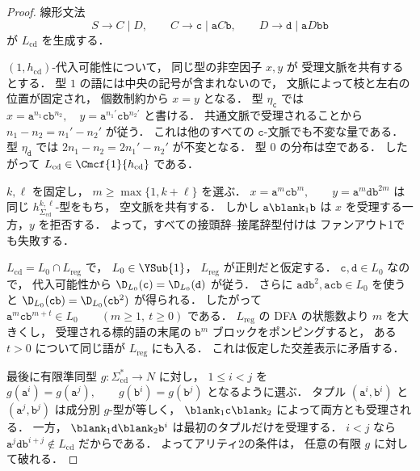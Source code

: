 \begin{proof}
線形文法
\[
 S\to C\mid D,\qquad
 C\to\mathtt c\mid\mathtt a C\mathtt b,\qquad
 D\to\mathtt d\mid\mathtt a D\mathtt b\mathtt b
\]
が $L_{\mathrm{cd}}$ を生成する．

$(1,h_{\mathrm{cd}})$-代入可能性について，
同じ型の非空因子 $x,y$ が
受理文脈を共有するとする．
型 $1$ の語には中央の記号が含まれないので，
文脈によって枝と左右の位置が固定され，
個数制約から $x=y$ となる．
型 $\eta_{\mathtt c}$ では
\(x=\mathtt a^{n_1}\mathtt c\mathtt b^{n_2}, \quad y=\mathtt a^{n_1'}\mathtt c\mathtt b^{n_2'}\)
と書ける．
共通文脈で受理されることから
$n_1-n_2=n_1'-n_2'$ が従う．
これは他のすべての $\mathtt c$-文脈でも不変な量である．
型 $\eta_{\mathtt d}$ では
$2n_1-n_2=2n_1'-n_2'$ が不変となる．
型 $0$ の分布は空である．
したがって
$L_{\mathrm{cd}}\in\Cmcf{1}{h_{\mathrm{cd}}}$ である．

$k,\ell$ を固定し，
$m\ge\max\{1,k+\ell\}$ を選ぶ．
\(x=\mathtt a^m\mathtt c\mathtt b^m,\qquad y=\mathtt a^m\mathtt d\mathtt b^{2m}\)
は同じ $h_{\Sigma_{\mathrm{cd}}}^{k,\ell}$-型をもち，
空文脈を共有する．
しかし
$\mathtt a\blank_1\mathtt b$ は
$x$ を受理する一方，$y$ を拒否する．
よって，すべての接頭辞--接尾辞型付けは
ファンアウト1でも失敗する．

$L_{\mathrm{cd}}=L_0\cap L_{\mathrm{reg}}$ で，
$L_0\in\YSub{1}$，
$L_{\mathrm{reg}}$ が正則だと仮定する．
$\mathtt c,\mathtt d\in L_0$ なので，
代入可能性から
$\D_{L_0}(\mathtt c)=\D_{L_0}(\mathtt d)$ が従う．
さらに
$\mathtt a\mathtt d\mathtt b^2,
 \mathtt a\mathtt c\mathtt b\in L_0$
を使うと
$\D_{L_0}(\mathtt c\mathtt b)
=\D_{L_0}(\mathtt c\mathtt b^2)$
が得られる．
したがって
\(\mathtt a^m\mathtt c\mathtt b^{m+t}\in L_0 \qquad(m\ge1,\ t\ge0)\)
である．
$L_{\mathrm{reg}}$ の DFA の状態数より $m$ を大きくし，
受理される標的語の末尾の
$\mathtt b^m$ ブロックをポンピングすると，
ある $t>0$ について同じ語が
$L_{\mathrm{reg}}$ にも入る．
これは仮定した交差表示に矛盾する．

最後に有限準同型
$g:\Sigma_{\mathrm{cd}}^*\to N$ に対し，
$1\le i<j$ を
\(g(\mathtt a^i)=g(\mathtt a^j),\qquad g(\mathtt b^i)=g(\mathtt b^j)\)
となるように選ぶ．
タプル
$(\mathtt a^i,\mathtt b^i)$ と
$(\mathtt a^j,\mathtt b^j)$
は成分別 $g$-型が等しく，
$\blank_1\mathtt c\blank_2$
によって両方とも受理される．
一方，
$\blank_1\mathtt d\blank_2\mathtt b^i$
は最初のタプルだけを受理する．
$i<j$ なら
$\mathtt a^j\mathtt d\mathtt b^{i+j}
\notin L_{\mathrm{cd}}$
だからである．
よってアリティ2の条件は，
任意の有限 $g$ に対して破れる．
\end{proof}

